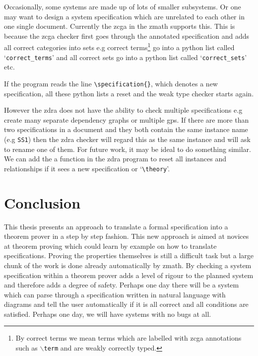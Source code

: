 Occasionally, some systems are made up of lots of smaller subsystems. Or
 one may want to design a system specification which are unrelated to
each other in one single document. Currently the \gls{zcga} in the \gls{zmath}
supports this. This is because the \gls{zcga} checker first goes through the
annotated specification and adds all correct categories into sets e.g correct
terms\footnote{By correct terms we mean terms which are labelled with \gls{zcga}
annotations such as $\backslash$\texttt{term} and are weakly correctly typed.}
go into a python list called `\texttt{correct\_terms}' and all correct sets go
into a python list called `\texttt{correct\_sets}' etc. 


If the program reads the line \verb|\specification{}|, which denotes a new
specification, all these python lists a reset and the weak type checker starts
again.

However the \gls{zdra} does not have the ability to check multiple
specifications e.g create many separate dependency graphs or multiple \gls{gps}.
If there are more than two specifications in a document and they both contain
the same instance name (e.g \texttt{SS1}) then the \gls{zdra} checker will
regard this as the same instance and will ask to rename one of them. For future
work, it may be ideal to do something similar. We can add the a function in the
\gls{zdra} program to reset all instances and relationships if it sees a new
specification or `\verb|\theory|'.

\section{Conclusion}
\label{sec:conclusion}

This thesis presents an approach to translate a formal specification into a
theorem prover in a step by step fashion. This new approach is aimed at novices
at theorem proving which could learn by example on how to translate
specifications. Proving the properties themselves is still a difficult task but
a large chunk of the work is done already automatically by \gls{zmath}. By
checking a system specification within a theorem prover adds a level of rigour
to the planned system and therefore adds a degree of safety. Perhaps one day
there will be a system which can parse through a specification written in
natural language with diagrams and tell the user automatically if it is all
correct and all conditions are satisfied. Perhaps one day, we will have systems
with no bugs at all.